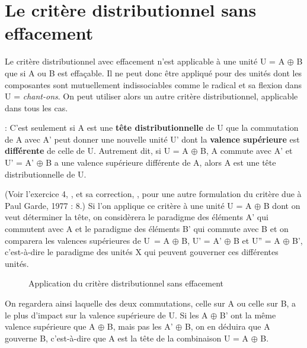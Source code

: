 \section{Le critère distributionnel sans effacement}\label{sec:3.3.13}

Le critère distributionnel avec effacement n’est applicable à une unité U = A ${\oplus}$ B que si A ou B est effaçable. Il ne peut donc être appliqué pour des unités dont les composantes sont mutuellement indissociables comme le radical et sa flexion dans U = \textit{chant-ons}. On peut utiliser alors un autre critère distributionnel, applicable dans tous les cas.

\begin{styleLivreImportant}
 : C’est seulement si A est une \textbf{tête distributionnelle} de U que la commutation de A avec A’ peut donner une nouvelle unité U’ dont la \textbf{valence supérieure} est \textbf{différente} de celle de U. Autrement dit, si U = A ${\oplus}$ B, A commute avec A’ et U’ = A’ ${\oplus}$ B a une valence supérieure différente de A, alors A est une tête distributionnelle de U.
\end{styleLivreImportant}

(Voir l’exercice 4, , et sa correction, , pour une autre formulation du critère due à Paul Garde, 1977 : 8.) Si l’on applique ce critère à une unité U = A ${\oplus}$ B dont on veut déterminer la tête, on considèrera le paradigme des éléments A’ qui commutent avec A et le paradigme des éléments B’ qui commute avec B et on comparera les valences supérieures de U~= A ${\oplus}$ B, U’ = A’ ${\oplus}$ B et U” = A ${\oplus}$ B’, c’est-à-dire le paradigme des unités X qui peuvent gouverner ces différentes unités.

\begin{figure}

\caption{\label{fig:}Application du critère distributionnel sans effacement}

\end{figure}

On regardera ainsi laquelle des deux commutations, celle sur A ou celle sur B, a le plus d’impact sur la valence supérieure de U. Si les A ${\oplus}$ B’ ont la même valence supérieure que A ${\oplus}$ B, mais pas les A’ ${\oplus}$ B, on en déduira que A gouverne B, c’est-à-dire que A est la tête de la combinaison U = A ${\oplus}$ B.

